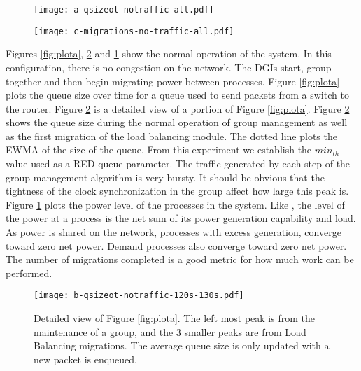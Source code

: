 \begin{figure}
\centering
\begin{minipage}{0.5\textwidth}
\centering
\texttt{[image: a-qsizeot-notraffic-all.pdf]}
\label{fig:plota}
\end{minipage}%
\begin{minipage}{0.5\textwidth}
\centering
\texttt{[image: c-migrations-no-traffic-all.pdf]}
\label{fig:plotc}
\end{minipage}
\end{figure}

Figures \ref{fig:plota}, \ref{fig:plotb} and \ref{fig:plotc} show the normal operation of the system.
In this configuration, there is no congestion on the network. 
The \ac{DGI}s start, group together and then begin migrating power between processes.
Figure \ref{fig:plota} plots the queue size over time for a queue used to send packets from a switch to the router.
Figure \ref{fig:plotb} is a detailed view of a portion of Figure \ref{fig:plota}.
Figure \ref{fig:plotb} shows the queue size during the normal operation of group management as well as the first migration of the load balancing module.
The dotted line plots the \ac{EWMA} of the size of the queue.
From this experiment we establish the $min_{th}$ value used as a \ac{RED} queue parameter.
The traffic generated by each step of the group management algorithm is very bursty.
It should be obvious that the tightness of the clock synchronization in the group affect how large this peak is.
Figure \ref{fig:plotc} plots the power level of the processes in the system.
Like \cite{HILTESTBED}, the level of the power at a process is the net sum of its power generation capability and load.
As power is shared on the network, processes with excess generation, converge toward zero net power.
Demand processes also converge toward zero net power.
The number of migrations completed is a good metric for how much work can be performed.

\begin{figure}
\centering
\texttt{[image: b-qsizeot-notraffic-120s-130s.pdf]}
\caption{Detailed view of Figure \ref{fig:plota}. The left most peak is from the maintenance of a group, and the 3 smaller peaks are from Load Balancing migrations. The average queue size is only updated with a new packet is enqueued.}
\label{fig:plotb}
\end{figure}


